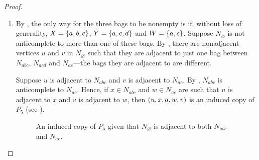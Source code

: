 \begin{proof}
\begin{enumerate}[label=(\roman*)]
            This shows that a connected component in $N_{\varnothing}$ not
            anticomplete to a $2$-bag is anticomplete to all other bags. Thus,
            each connected component of $G[N_{\varnothing}]$ is anticomplete to
            all bags but one.

        \item By , the only way for the three bags to be
            nonempty is if, without loss of generality, $X=\left\{a,b,c\right\}$,
            $Y=\left\{a,c,d\right\}$ and $W=\left\{a,c\right\}$. Suppose $N_\varnothing$ is not
            anticomplete to more than one of these bags. By ,
            there are nonadjacent vertices $u$ and $v$ in $N_\varnothing$ such
            that they are adjacent to just one bag between $N_{abc}$, $N_{acd}$
            and $N_{ac}$---the bags they are adjacent to are different. 
            
            Suppose $u$ is adjacent to $N_{abc}$ and $v$ is adjacent to
            $N_{ac}$. By , $N_{abc}$ is anticomplete to
            $N_{ac}$. Hence, if $x\in N_{abc}$ and $w\in N_{ac}$ are such that
            $u$ is adjacent to $x$ and $v$ is adjacent to $w$, then
            $\left(u,x,a,w,v\right)$ is an induced copy of $P_5$ (see ).
            \begin{figure}[htb!]
                \centering
                \caption{An induced copy of $P_5$ given that $N_\varnothing$ is
                    adjacent to both $N_{abc}$ and $N_{ac}$.}
                \label{fig:type_9}
            \end{figure}


\end{enumerate}
\end{proof}
